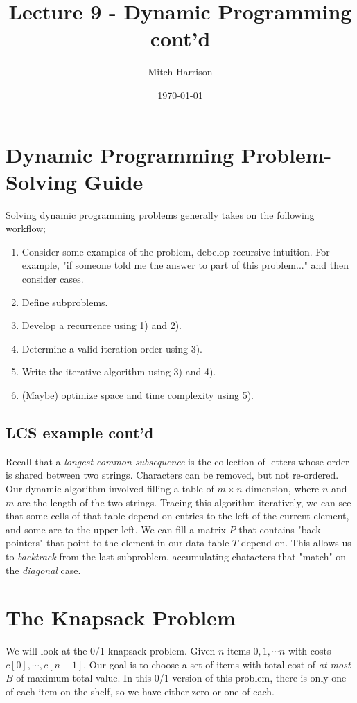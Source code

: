 \documentclass[titlepage, 12pt, leqno]{article}
\title{\Huge{Lecture 9 - Dynamic Programming cont'd}}
\author{\large{Mitch Harrison}}
\date{\today}
\begin{document}
\setlength{\parskip}{1\baselineskip}
\setlength{\parindent}{15pt}
\maketitle
\tableofcontents
\newpage


\section{Dynamic Programming Problem-Solving Guide}
Solving dynamic programming problems generally takes on the following workflow;
\begin{enumerate}
    \item Consider some examples of the problem, debelop recursive intuition. 
        For example, "if someone told me the answer to part of this problem..."
        and then consider cases.
    \item Define subproblems.
    \item Develop a recurrence using 1) and 2).
    \item Determine a valid iteration order using 3).
    \item Write the iterative algorithm using 3) and 4).
    \item (Maybe) optimize space and time complexity using 5).
\end{enumerate}

\subsection{LCS example cont'd}
Recall that a \textit{longest common subsequence} is the collection of letters
whose order is shared between two strings. Characters can be removed, but not
re-ordered. Our dynamic algorithm involved filling a table of $m \times n$
dimension, where $n$ and $m$ are the length of the two strings. Tracing this
algorithm iteratively, we can see that some cells of that table depend on 
entries to the left of the current element, and some are to the upper-left. We
can fill a matrix $P$ that contains "back-pointers" that point to the element
in our data table $T$ depend on. This allows us to \textit{backtrack} from the
last subproblem, accumulating chatacters that "match" on the \textit{diagonal}
case.

\pagebreak
\section{The Knapsack Problem}
We will look at the 0/1 knapsack problem. Given $n$ items
$0, 1, \cdots n$ with costs $c[0], \cdots , c[n-1]$. Our goal is to choose a
set of items with total cost of \textit{at most} $B$ of maximum total value. In
this 0/1 version of this problem, there is only one of each item on the shelf,
so we have either zero or one of each.
\end{document}
